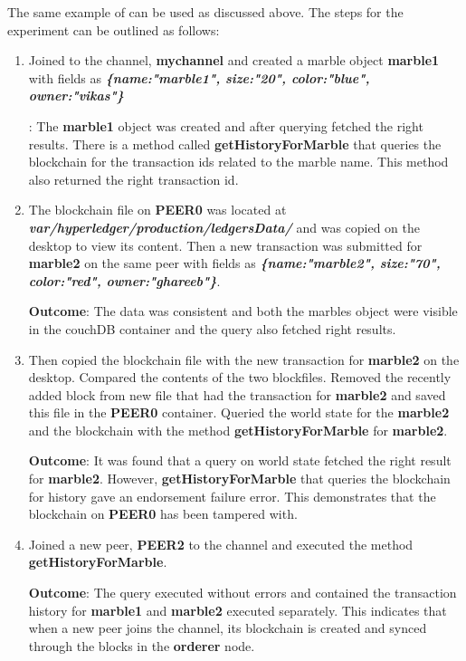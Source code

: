 \documentclass[
  a4paper,  %
  twoside,  %
  bibliography=totoc,
  headsepline,
  cleardoublepage=empty,
  parskip=half,
  draft=false
]{scrbook}
\begin{document}
The same example of  \cite{marbles} can be used as discussed above. The steps for the experiment can be outlined as follows:
\begin{enumerate}
    \item Joined  to the channel, \textbf{mychannel} and created a marble object \textbf{marble1} with fields as {\ttfamily\bfseries\slshape \{name:"marble1", size:"20", color:"blue", owner:"vikas"\}}
    
    : The \textbf{marble1} object was created and after querying fetched the right results. There is a method called \textbf{getHistoryForMarble} that queries the blockchain for the transaction ids related to the marble name. This method also returned the right transaction id.
    \item The blockchain file on \textbf{PEER0} was located at {\ttfamily\bfseries\slshape var/hyperledger/production/ledgersData/} and was copied on the desktop to view its content. Then a new transaction was submitted for \textbf{marble2} on the same peer with fields as {\ttfamily\bfseries\slshape \{name:"marble2", size:"70", color:"red", owner:"ghareeb"\}}.
    
    \textbf{Outcome}: The data was consistent and both the marbles object were visible in the couchDB container and the query also fetched right results.
    \item Then copied the blockchain file with the new transaction for \textbf{marble2} on the desktop. Compared the contents of the two blockfiles. Removed the recently added block from new file that had the transaction for \textbf{marble2} and saved this file in the \textbf{PEER0} container. Queried the world state for the \textbf{marble2} and the blockchain with the method \textbf{getHistoryForMarble} for \textbf{marble2}.
    
    \textbf{Outcome}: It was found that a query on world state fetched the right result for \textbf{marble2}. However, \textbf{getHistoryForMarble} that queries the blockchain for  history gave an endorsement failure error. This demonstrates that the blockchain on \textbf{PEER0} has been tampered with.
    \item Joined a new peer, \textbf{PEER2} to the channel and executed the method \textbf{getHistoryForMarble}. 
    
    \textbf{Outcome}: The query executed without errors and contained the transaction history for \textbf{marble1} and \textbf{marble2} executed separately. This indicates that when a new peer joins the channel, its blockchain is created and synced through the blocks in the \textbf{orderer} node. 
    
\end{enumerate}
\end{document}
